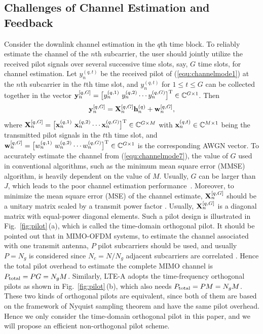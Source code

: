 \documentclass[final]{IEEEtran}
\begin{document}
\subsection{Challenges of Channel Estimation and Feedback}\label{challenging}

 Consider the downlink channel estimation in the $q$th time block. To reliably estimate
 the channel of the $n$th subcarrier, the user should jointly utilize the received pilot
 signals over several successive time slots, say, $G$ time slots, for channel estimation.
 Let $y_n^{(q,t)}$ be the received pilot of (\ref{equ:channelmode1}) at the $n$th
 subcarrier in the $t$th time slot, and $y_n^{(q,t)}$ for $1\le t\le G$ can be collected
 together in the vector ${\bf y}_n^{[q,G]}=\big[ y_n^{(q,1)} ~ y_n^{(q,2)} \cdots
 y_n^{(q,G)}\big]^{\rm T} \in \mathbb{C}^{G\times 1}$. Then
\begin{equation}\label{equ:channelmode7} %
 {\bf y}_n^{[q,G]} = {\bf X}^{[q,G]}_n {\bf h}_n^{(q)} + {\bf w}_n^{[q,G]} ,
\end{equation}
 where  ${\bf X}^{[q,G]}_n=\big[ {\bf x}_n^{(q,1)} ~ {\bf x}_n^{(q,2)} \cdots
 {\bf x}_n^{(q,G)}\big]^{\rm T}\in \mathbb{C}^{G\times M}$ with ${\bf x}_n^{(q,t)}\in
 \mathbb{C}^{M\times 1}$ being the transmitted pilot signals in the $t$th time slot,
 and ${\bf w}_n^{[q,G]}=\big[ w_n^{(q,1)} ~ w_n^{(q,2)} \cdots w_n^{(q,G)}\big]^{\rm T}\in
 \mathbb{C}^{G\times 1}$ is the corresponding AWGN vector. To accurately estimate the
 channel from (\ref{equ:channelmode7}), the value of $G$ used in conventional algorithms,
 such as the minimum mean square error (MMSE) algorithm, is heavily dependent on the
 value of $M$. Usually, $G$ can be larger than $J$, which leads
 to the poor channel estimation performance~\cite{orthogonal}. Moreover, to minimize the
 mean square error (MSE) of the channel estimate, ${\bf X}_n^{[q,G]}$ should be a unitary
 matrix scaled by a transmit power factor \cite{orthogonal}. Usually, ${\bf X}^{[q,G]}_n$
 is a diagonal matrix with equal-power diagonal elements. Such a pilot design is
 illustrated in Fig.~\ref{fig:pilot}\,(a), which is called the time-domain orthogonal
 pilot. It should be pointed out that in MIMO-OFDM systems, to estimate the channel
 associated with one transmit antenna, $P$ pilot subcarriers should be used, and usually
 $P=N_g$ is considered since $N_c=N/N_g$ adjacent subcarriers are correlated \cite{orthogonal}.
 Hence the total pilot overhead to estimate the complete MIMO channel is $P_{\rm total}=
 P G=N_g M$. Similarly, LTE-A adopts the time-frequency orthogonal pilots as shown in
 Fig.~\ref{fig:pilot}\,(b), which also needs $P_{\rm total}=P M=N_g M$. These two kinds of
 orthogonal pilots are equivalent, since both of them are based on the framework of Nyquist
 sampling theorem and have the same pilot overhead. Hence we only consider the time-domain
 orthogonal pilot in this paper, and we will propose an efficient non-orthogonal pilot scheme.
\end{document}
